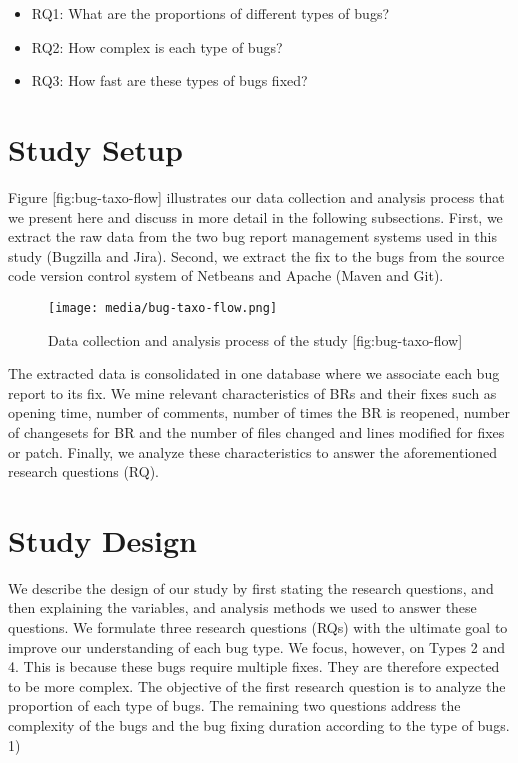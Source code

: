 \begin{itemize}
\item
  RQ1: What are the proportions of different types of bugs?
\item
  RQ2: How complex is each type of bugs?
\item
  RQ3: How fast are these types of bugs fixed?
\end{itemize}

\section{Study Setup}\label{study-setup}

Figure {[}fig:bug-taxo-flow{]} illustrates our data collection and
analysis process that we present here and discuss in more detail in the
following subsections. First, we extract the raw data from the two bug
report management systems used in this study (Bugzilla and Jira).
Second, we extract the fix to the bugs from the source code version
control system of Netbeans and Apache (Maven and Git).

\begin{figure}[htbp]
\centering
\texttt{[image: media/bug-taxo-flow.png]}
\caption{Data collection and analysis process of the study
{[}fig:bug-taxo-flow{]}}
\end{figure}

The extracted data is consolidated in one database where we associate
each bug report to its fix. We mine relevant characteristics of BRs and
their fixes such as opening time, number of comments, number of times
the BR is reopened, number of changesets for BR and the number of files
changed and lines modified for fixes or patch. Finally, we analyze these
characteristics to answer the aforementioned research questions (RQ).

\section{Study Design}\label{study-design}

We describe the design of our study by first stating the research
questions, and then explaining the variables, and analysis methods we
used to answer these questions. We formulate three research questions
(RQs) with the ultimate goal to improve our understanding of each bug
type. We focus, however, on Types 2 and 4. This is because these bugs
require multiple fixes. They are therefore expected to be more complex.
The objective of the first research question is to analyze the
proportion of each type of bugs. The remaining two questions address the
complexity of the bugs and the bug fixing duration according to the type
of bugs. 1)


